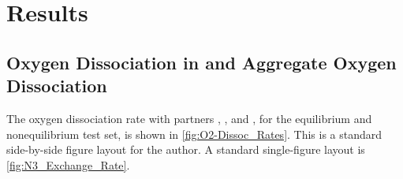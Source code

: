 \graphicspath{{./results/}}

\chapter{Results}
\label{sec:Results}

\section[Short Name for Section]
   {Oxygen Dissociation in  and Aggregate Oxygen Dissociation}
\label{sec:O2_N2}
The oxygen dissociation rate with partners , , and , for the equilibrium and nonequilibrium test set,
   is shown in \cref{fig:O2-Dissoc_Rates}.
This is a standard side-by-side figure layout for the author.
A standard single-figure layout is \cref{fig:N3_Exchange_Rate}.

